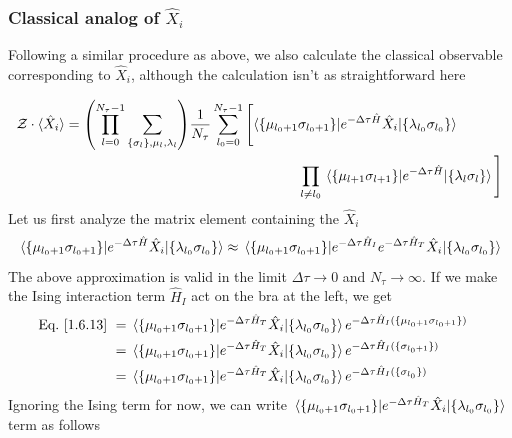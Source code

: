 \documentclass[../thesis_main.tex]{subfiles}
\begin{document}
\subsubsection{Classical analog of $\hat{X}_i$}
Following a similar procedure as above, we also calculate the classical observable corresponding to $\hat{X}_i$, although the calculation isn't as straightforward here

\begingroup
\allowdisplaybreaks
\begin{align}
    \mathcal{Z} \cdot \langle {\hat{X}_i} \rangle
    = \qty(\prod_{l=0}^{N_\tau - 1} \sum_{\{\sigma_l \}, \mu_l, \lambda_l}) \frac{1}{N_\tau} \sum_{l_0 = 0}^{N_\tau - 1} \Bigg[\langle\{\mu_{l_0+1}& \sigma _{l_0+1}\}|{e^{-\Delta \tau \hat{H}} \hat{X}_i}|{\{\lambda_{l_0} \sigma _{l_0}\}}\rangle \qquad \nonumber \\ 
    & \prod_{l \neq l_0} \mel{\{\mu_{l+1} \sigma _{l+1}\}}{e^{-\Delta \tau \hat{H}}}{\{\lambda_{l} \sigma _{l}\}} \Bigg]
    \label{operator_x_i}
\end{align}
\endgroup
Let us first analyze the matrix element containing the $\hat{X}_i$
\begin{equation}
    \mel{\{\mu_{l_0+1} \sigma _{l_0+1}\}}{e^{-\Delta \tau \hat{H}} \hat{X}_i}{\{\lambda_{l_0} \sigma _{l_0}\}} \approx \mel{\{\mu_{l_0+1} \sigma _{l_0+1}\}}{e^{-\Delta \tau \hat{H}_I} e^{-\Delta \tau \hat{H}_T} \hat{X}_i}{\{\lambda_{l_0} \sigma _{l_0}\}}
    \label{1.6.13}
\end{equation}
The above approximation is valid in the limit $\Delta \tau \to 0$ and $N_\tau \to \infty$. If we make the Ising interaction term $\hat{H}_I$ act on the bra at the left, we get
\begin{align}
    \text{Eq.~\eqref{1.6.13} }& = \mel{\{\mu_{l_0+1} \sigma _{l_0+1}\}}{e^{-\Delta \tau \hat{H}_T} \hat{X}_i}{\{\lambda_{l_0} \sigma _{l_0}\}} e^{-\Delta \tau \hat{H}_I(\{\mu_{l_0+1} \sigma_{l_0+1}\})} \nonumber && \\
    & = \mel{\{\mu_{l_0+1} \sigma _{l_0+1}\}}{e^{-\Delta \tau \hat{H}_T} \hat{X}_i}{\{\lambda_{l_0} \sigma _{l_0}\}} e^{-\Delta \tau \hat{H}_I(\{\sigma_{l_0+1}\})} \nonumber && \\
    & = \mel{\{\mu_{l_0+1} \sigma _{l_0+1}\}}{e^{-\Delta \tau \hat{H}_T} \hat{X}_i}{\{\lambda_{l_0} \sigma _{l_0}\}} e^{-\Delta \tau \hat{H}_I(\{\sigma_{l_0}\})}
\end{align}
Ignoring the Ising term for now, we can write $\mel{\{\mu_{l_0+1} \sigma _{l_0+1}\}}{e^{-\Delta \tau \hat{H}_T} \hat{X}_i}{\{\lambda_{l_0} \sigma _{l_0}\}}$ term as follows 
\end{document}
